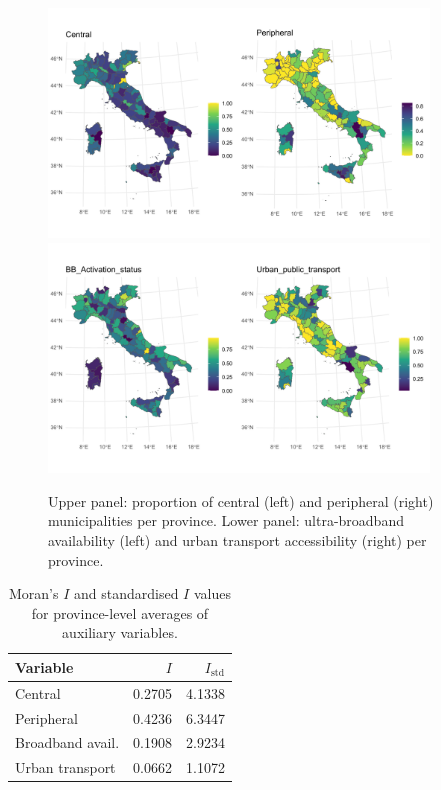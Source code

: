 \documentclass{book}
\begin{document}
%
\begin{figure}[htbp]
    \centering
    \includegraphics[width=0.9\textwidth]{X_prov_1.pdf} \\%
    \includegraphics[width=0.9\textwidth]{X_prov_2.pdf} 
    \caption{Upper panel: proportion of central (left) and peripheral (right) municipalities per province.
    Lower panel: ultra-broadband availability (left) and urban transport accessibility (right) per province.}
    \label{fig:Xprov}
\end{figure}
%


\begin{table}[ht]
\centering
\begin{tabular}{lrr}
Variable & $I$ & $I_\mathrm{std}$  \\ \hline
Central & 0.2705 & 4.1338   \\  
Peripheral & 0.4236 & 6.3447   \\
Broadband avail. & 0.1908 & 2.9234 \\ 
Urban transport & 0.0662 & 1.1072  \\  
\hline
\end{tabular}
\caption{Moran's $I$ and standardised $I$ values for province-level averages of auxiliary variables.}
\label{tab:MoranProv}
\end{table}
\end{document}
